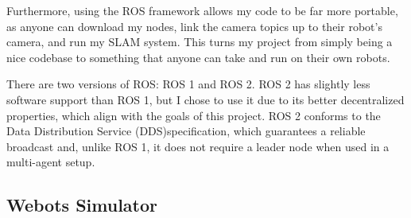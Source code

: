 Furthermore, using the ROS framework allows my code to be far more portable, as anyone can download my nodes, link the camera topics up to their robot's camera, and run my SLAM system. This turns my project from simply being a nice codebase to something that anyone can take and run on their own robots.

There are two versions of ROS: ROS 1 and ROS 2. ROS 2 has slightly less software support than ROS 1, but I chose to use it due to its better decentralized properties, which align with the goals of this project. ROS 2 conforms to the Data Distribution Service (DDS)\footnotemark[1] specification, which guarantees a reliable broadcast and, unlike ROS 1, it does not require a leader node when used in a multi-agent setup.


\subsection{Webots Simulator}
\label{sec:2.2.2}
